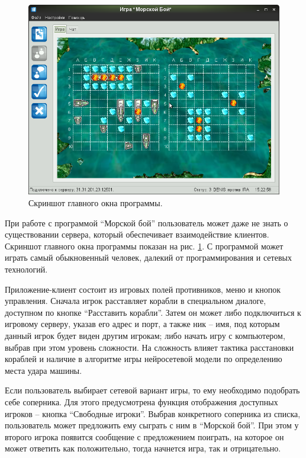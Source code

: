 \documentclass[12pt, a4paper, oneside]{article}
\begin{document}
\begin{figure}[h]
\begin{center}
	\includegraphics[scale=0.63]{seabattle.png}
	\caption{Скриншот главного окна программы.}
	\label{fig:client}
	\vspace{-0.5cm}
\end{center}
\end{figure}

При работе с программой ``Морской бой'' пользователь может даже не знать о существовании сервера, который обеспечивает взаимодействие клиентов. Скриншот главного окна программы показан на рис. \ref{fig:client}. С программой может играть самый обыкновенный человек, далекий от программирования и сетевых технологий.

Приложение-клиент состоит из игровых полей противников, меню и кнопок управления. Сначала игрок расставляет корабли в специальном диалоге, доступном по кнопке ``Расставить корабли''. Затем он может либо подключиться к игровому серверу, указав его адрес и порт, а также ник -- имя, под которым данный игрок будет виден другим игрокам; либо начать игру с компьютером, выбрав при этом уровень сложности. На сложность влияет тактика расстановки кораблей и наличие в алгоритме игры нейросетевой модели по определению места удара машины.

Если пользователь выбирает сетевой вариант игры, то ему необходимо подобрать себе соперника. Для этого предусмотрена функция отображения доступных игроков -- кнопка ``Свободные игроки''. Выбрав конкретного соперника из списка, пользователь может предложить ему сыграть с ним в ``Морской бой''. При этом у второго игрока появится сообщение с предложением поиграть, на которое он может ответить как положительно, тогда начнется игра, так и отрицательно. 
\end{document}
